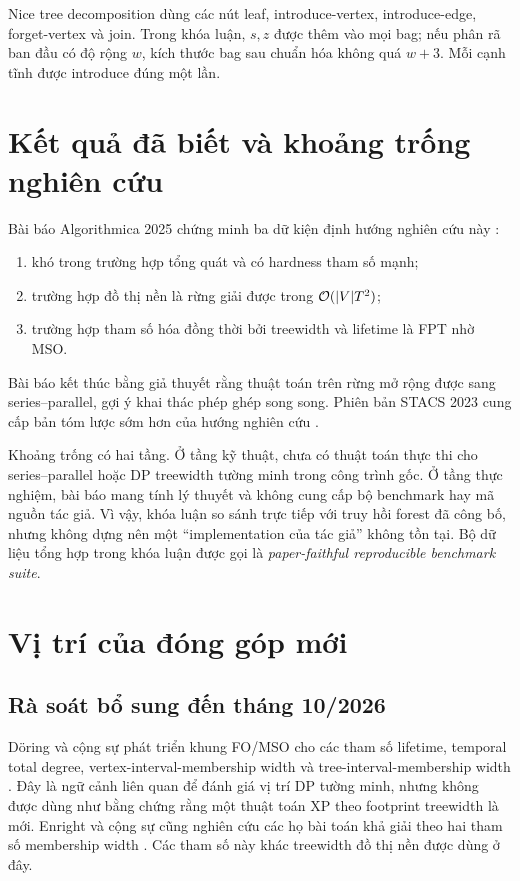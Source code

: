 Nice tree decomposition dùng các nút leaf, introduce-vertex, introduce-edge, forget-vertex và join. Trong khóa luận, $s,z$ được thêm vào mọi bag; nếu phân rã ban đầu có độ rộng $w$, kích thước bag sau chuẩn hóa không quá $w+3$. Mỗi cạnh tĩnh được introduce đúng một lần.

\section{Kết quả đã biết và khoảng trống nghiên cứu}

Bài báo Algorithmica 2025 chứng minh ba dữ kiện định hướng nghiên cứu này \cite{enright2025}:
\begin{enumerate}
  \item \TP{} khó trong trường hợp tổng quát và có hardness tham số mạnh;
  \item trường hợp đồ thị nền là rừng giải được trong $\mathcal{O}(|V|T^2)$;
  \item trường hợp tham số hóa đồng thời bởi treewidth và lifetime là FPT nhờ MSO.
\end{enumerate}
Bài báo kết thúc bằng giả thuyết rằng thuật toán trên rừng mở rộng được sang series--parallel, gợi ý khai thác phép ghép song song. Phiên bản STACS 2023 cung cấp bản tóm lược sớm hơn của hướng nghiên cứu \cite{enright2023}.

Khoảng trống có hai tầng. Ở tầng kỹ thuật, chưa có thuật toán thực thi cho series--parallel hoặc DP treewidth tường minh trong công trình gốc. Ở tầng thực nghiệm, bài báo mang tính lý thuyết và không cung cấp bộ benchmark hay mã nguồn tác giả. Vì vậy, khóa luận so sánh trực tiếp với truy hồi forest đã công bố, nhưng không dựng nên một ``implementation của tác giả'' không tồn tại. Bộ dữ liệu tổng hợp trong khóa luận được gọi là \emph{paper-faithful reproducible benchmark suite}.

\section{Vị trí của đóng góp mới}

\subsection{Rà soát bổ sung đến tháng 10/2026}

Döring và cộng sự phát triển khung FO/MSO cho các tham số lifetime, temporal total degree, vertex-interval-membership width và tree-interval-membership width \cite{doering2026}. Đây là ngữ cảnh liên quan để đánh giá vị trí DP tường minh, nhưng không được dùng như bằng chứng rằng một thuật toán XP theo footprint treewidth là mới. Enright và cộng sự cũng nghiên cứu các họ bài toán khả giải theo hai tham số membership width \cite{enright2026}. Các tham số này khác treewidth đồ thị nền được dùng ở đây.

